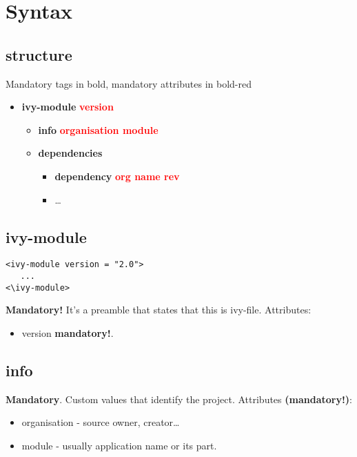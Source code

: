 \documentclass{report}
\begin{document}
\chapter{Syntax}


\section{structure}
Mandatory tags in bold, mandatory attributes in bold-red
\begin{itemize}
  \item \textbf{ivy-module} \textbf{\textcolor{red}{version}}
  \begin{itemize}
    \item \textbf{info} \textbf{\textcolor{red}{organisation module}}
    \item \textbf{dependencies}
    \begin{itemize}
      \item \textbf{dependency} \textbf{\textcolor{red}{org name rev}}
      \item \ldots
    \end{itemize}
  \end{itemize}
\end{itemize}


\section{ivy-module}

\begin{verbatim}
<ivy-module version = "2.0">
   ...
<\ivy-module>
\end{verbatim}

\textbf{Mandatory!} It's a preamble that states that this is ivy-file. 
Attributes:
\begin{itemize}
  \item version \textbf{mandatory!}.
\end{itemize}


\section{info}

\textbf{Mandatory}. Custom values that identify the project. Attributes \textbf{(mandatory!)}:
\begin{itemize}
  \item organisation - source owner, creator\ldots
  \item module - usually application name or its part.
\end{itemize}
\end{document}
